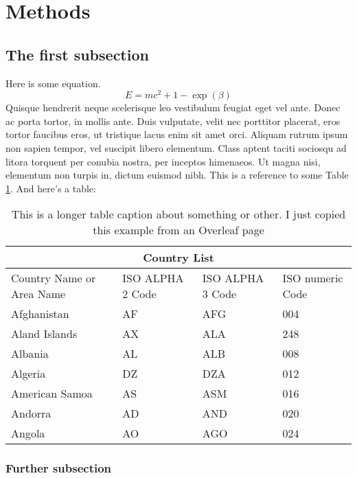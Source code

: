\section{Methods}
\lipsum[1]
\subsection{The first subsection}
\lipsum[1]

Here is some equation.
\begin{equation}
    E = mc^2 + 1 - \exp(\beta)
\end{equation}
\lipsum[2-3]
Quisque hendrerit neque scelerisque leo vestibulum feugiat eget vel ante. 
Donec ac porta tortor, in mollis ante. 
Duis vulputate, velit nec porttitor placerat, eros tortor faucibus eros, ut tristique lacus enim sit amet orci. 
Aliquam rutrum ipsum non sapien tempor, vel suscipit libero elementum. 
Class aptent taciti sociosqu ad litora torquent per conubia nostra, per inceptos himenaeos. 
Ut magna nisi, elementum non turpis in, dictum euismod nibh.
This is a reference to some Table \ref{sometable}.
And here's a table:
\begin{table}[h!]
\centering
\caption[This is the table caption for the list]{This is a longer table caption about something or other. I just copied this example from an Overleaf page}
\label{sometable}
\begin{tabular}{ |p{3cm}||p{3cm}|p{3cm}|p{3cm}|  }
 \hline
 \multicolumn{4}{|c|}{Country List} \\
 \hline
 Country Name or Area Name& ISO ALPHA 2 Code &ISO ALPHA 3 Code&ISO numeric Code\\
 \hline
 Afghanistan   & AF    &AFG&   004\\
 Aland Islands&   AX  & ALA   &248\\
 Albania &AL & ALB&  008\\
 Algeria    &DZ & DZA&  012\\
 American Samoa&   AS  & ASM&016\\
 Andorra& AD  & AND   &020\\
 Angola& AO  & AGO&024\\
 \hline
\end{tabular}
\end{table}

\subsubsection{Further subsection}
\lipsum[30-33]